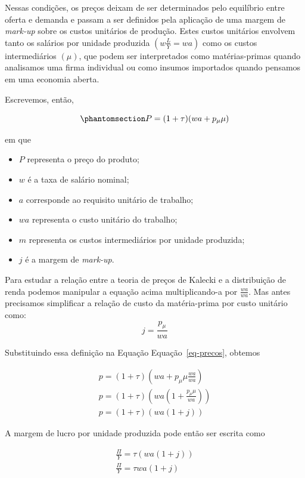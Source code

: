 \documentclass[
  brazilian,
  letterpaper,
  DIV=11,
  numbers=noendperiod]{scrreprt}
\providecommand{\tightlist}{%
  \setlength{\itemsep}{0pt}\setlength{\parskip}{0pt}}
\begin{document}
Nessas condições, os preços deixam de ser determinados pelo equilíbrio
entre oferta e demanda e passam a ser definidos pela aplicação de uma
margem de \emph{mark-up} sobre os custos unitários de produção. Estes
custos unitários envolvem tanto os salários por unidade produzida
\((w \frac{L}{Y} = wa)\) como os custos intermediários \((\mu)\), que
podem ser interpretados como matérias-primas quando analisamos uma firma
individual ou como insumos importados quando pensamos em uma economia
aberta.

Escrevemos, então,

\begin{equation}\protect\phantomsection\label{eq-precos}{P=(1+ \tau)(wa+ p_\mu \mu)}\end{equation}

em que

\begin{itemize}
\tightlist
\item
  \(P\) representa o preço do produto;
\item
  \(w\) é a taxa de salário nominal;
\item
  \(a\) corresponde ao requisito unitário de trabalho;
\item
  \(wa\) representa o custo unitário do trabalho;
\item
  \(m\) representa os custos intermediários por unidade produzida;
\item
  \(j\) é a margem de \emph{mark-up}.
\end{itemize}

Para estudar a relação entre a teoria de preços de Kalecki e a
distribuição de renda podemos manipular a equação acima multiplicando-a
por \(\frac{wa}{wa}\). Mas antes precisamos simplificar a relação de
custo da matéria-prima por custo unitário como: \[j=\frac{p_\mu}{wa}\]

Substituindo essa definição na Equação Equação~\ref{eq-precos}, obtemos

\[\begin{aligned}
p = (1+\tau) \left({wa}+p_\mu \mu \frac{wa}{wa}\right)\\
p = (1+\tau) \left({wa}\left(1+\frac{p_\mu\mu}{wa}\right)\right)\\
p=(1+\tau)(wa(1+j))
\end{aligned}\]

A margem de lucro por unidade produzida pode então ser escrita como

\[\begin{aligned}
\frac{\Pi}{Y}=\tau(wa(1+j))\\
\frac{\Pi}{Y}=\tau wa(1+j)
\end{aligned}\]
\end{document}
